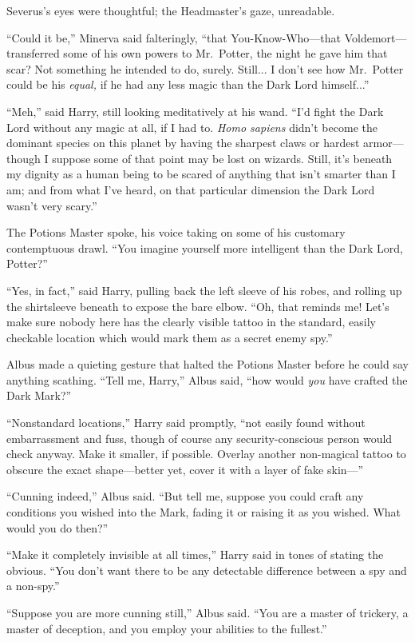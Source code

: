 Severus’s eyes were thoughtful; the Headmaster’s gaze, unreadable.

“Could it be,” Minerva said falteringly, “that You-Know-Who—that Voldemort—transferred some of his own powers to Mr.~Potter, the night he gave him that scar? Not something he intended to do, surely. Still... I don’t see how Mr.~Potter could be his \emph{equal,} if he had any less magic than the Dark Lord himself...”

“Meh,” said Harry, still looking meditatively at his wand. “I’d fight the Dark Lord without any magic at all, if I had to. \emph{Homo sapiens} didn’t become the dominant species on this planet by having the sharpest claws or hardest armor—though I suppose some of that point may be lost on wizards. Still, it’s beneath my dignity as a human being to be scared of anything that isn’t smarter than I am; and from what I’ve heard, on that particular dimension the Dark Lord wasn’t very scary.”

The Potions Master spoke, his voice taking on some of his customary contemptuous drawl. “You imagine yourself more intelligent than the Dark Lord, Potter?”

“Yes, in fact,” said Harry, pulling back the left sleeve of his robes, and rolling up the shirtsleeve beneath to expose the bare elbow. “Oh, that reminds me! Let’s make sure nobody here has the clearly visible tattoo in the standard, easily checkable location which would mark them as a secret enemy spy.”

Albus made a quieting gesture that halted the Potions Master before he could say anything scathing. “Tell me, Harry,” Albus said, “how would \emph{you} have crafted the Dark Mark?”

“Nonstandard locations,” Harry said promptly, “not easily found without embarrassment and fuss, though of course any security-conscious person would check anyway. Make it smaller, if possible. Overlay another non-magical tattoo to obscure the exact shape—better yet, cover it with a layer of fake skin—”

“Cunning indeed,” Albus said. “But tell me, suppose you could craft any conditions you wished into the Mark, fading it or raising it as you wished. What would you do then?”

“Make it completely invisible at all times,” Harry said in tones of stating the obvious. “You don’t want there to be any detectable difference between a spy and a non-spy.”

“Suppose you are more cunning still,” Albus said. “You are a master of trickery, a master of deception, and you employ your abilities to the fullest.”


